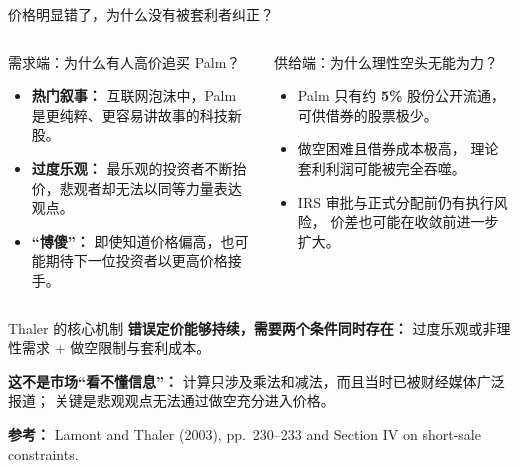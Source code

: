 \documentclass[UTF8,aspectratio=169,11pt]{ctexbeamer}
\begin{document}
\begin{frame}{价格明显错了，为什么没有被套利者纠正？}
\scriptsize

\begin{columns}[T,totalwidth=\textwidth]

\begin{casebox}{需求端：为什么有人高价追买 Palm？}
\begin{itemize}
\item \textbf{热门叙事：}
      互联网泡沫中，Palm 是更纯粹、更容易讲故事的科技新股。
\item \textbf{过度乐观：}
      最乐观的投资者不断抬价，悲观者却无法以同等力量表达观点。
\item \textbf{“博傻”：}
      即使知道价格偏高，也可能期待下一位投资者以更高价格接手。
\end{itemize}
\end{casebox}

\begin{riskbox}{供给端：为什么理性空头无能为力？}
\begin{itemize}
\item Palm 只有约 \textbf{5\%} 股份公开流通，
      可供借券的股票极少。
\item 做空困难且借券成本极高，
      理论套利利润可能被完全吞噬。
\item IRS 审批与正式分配前仍有执行风险，
      价差也可能在收敛前进一步扩大。
\end{itemize}
\end{riskbox}

\end{columns}

\vspace{0.10cm}

\begin{greenbox}{Thaler 的核心机制}
\centering
\textbf{错误定价能够持续，需要两个条件同时存在：}
\quad
过度乐观或非理性需求
\;+\;
做空限制与套利成本。
\end{greenbox}

\vspace{0.08cm}

\begin{center}
\textbf{这不是市场“看不懂信息”：}
计算只涉及乘法和减法，而且当时已被财经媒体广泛报道；
关键是悲观观点无法通过做空充分进入价格。
\end{center}

\vspace{0.02cm}
{\tiny\color{aqgray}
\textbf{参考：}
Lamont and Thaler (2003), pp.~230--233
and Section IV on short-sale constraints.
}

\end{frame}
\end{document}

